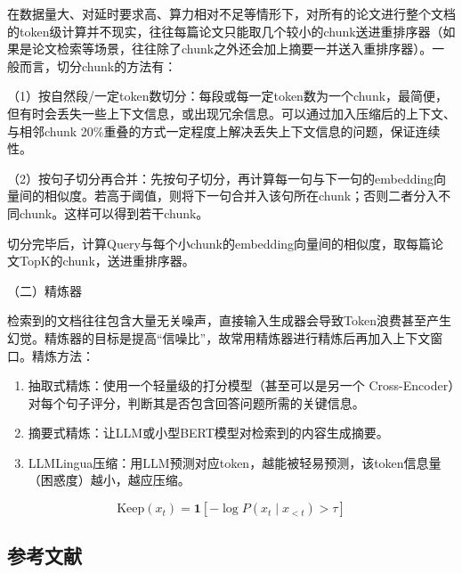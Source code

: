 在数据量大、对延时要求高、算力相对不足等情形下，对所有的论文进行整个文档的token级计算并不现实，往往每篇论文只能取几个较小的chunk送进重排序器（如果是论文检索等场景，往往除了chunk之外还会加上摘要一并送入重排序器）。一般而言，切分chunk的方法有：

（1）按自然段/一定token数切分：每段或每一定token数为一个chunk，最简便，但有时会丢失一些上下文信息，或出现冗余信息。可以通过加入压缩后的上下文、与相邻chunk 20\%重叠的方式一定程度上解决丢失上下文信息的问题，保证连续性。

（2）按句子切分再合并：先按句子切分，再计算每一句与下一句的embedding向量间的相似度。若高于阈值，则将下一句合并入该句所在chunk；否则二者分入不同chunk。这样可以得到若干chunk。

切分完毕后，计算Query与每个小chunk的embedding向量间的相似度，取每篇论文TopK的chunk，送进重排序器。

（二）精炼器

检索到的文档往往包含大量无关噪声，直接输入生成器会导致Token浪费甚至产生幻觉。精炼器的目标是提高``信噪比''，故常用精炼器进行精炼后再加入上下文窗口。精炼方法：

\begin{enumerate}
\def\labelenumi{\arabic{enumi}.}
\item
  抽取式精炼：使用一个轻量级的打分模型（甚至可以是另一个 Cross-Encoder）对每个句子评分，判断其是否包含回答问题所需的关键信息。
\item
  摘要式精炼：让LLM或小型BERT模型对检索到的内容生成摘要。
\item
  LLMLingua压缩：用LLM预测对应token，越能被轻易预测，该token信息量（困惑度）越小，越应压缩。
\end{enumerate}

\[
\mathrm{Keep}(x_t)=\mathbf{1}\!\left[-\log P\!\left(x_t\mid x_{<t}\right)>\tau\right]
\]

\hypertarget{ux53c2ux8003ux6587ux732e-125}{%
\subsection{参考文献}\label{ux53c2ux8003ux6587ux732e-125}}

